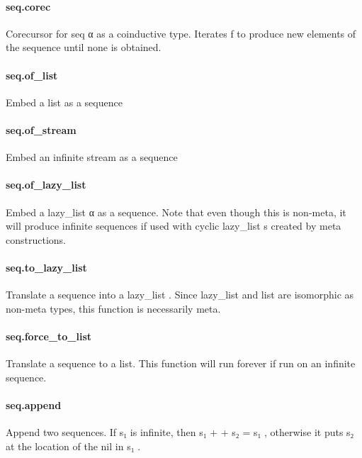 \documentclass{article}
\begin{document}
\paragraph{seq.corec}
\par
Corecursor for 
\colorbox[RGB]{253,246,227}{{{{\color[RGB]{101, 123, 131} seq α }}}} as a coinductive type. Iterates 
\colorbox[RGB]{253,246,227}{{{{\color[RGB]{101, 123, 131} f }}}} to produce new elements
of the sequence until 
\colorbox[RGB]{253,246,227}{{{{\color[RGB]{101, 123, 131} none }}}} is obtained.
\paragraph{seq.of\_list}
\par
Embed a list as a sequence
\paragraph{seq.of\_stream}
\par
Embed an infinite stream as a sequence
\paragraph{seq.of\_lazy\_list}
\par
Embed a 
\colorbox[RGB]{253,246,227}{{{{\color[RGB]{101, 123, 131} lazy\_list α }}}} as a sequence. Note that even though this
is non-meta, it will produce infinite sequences if used with
cyclic 
\colorbox[RGB]{253,246,227}{{{{\color[RGB]{101, 123, 131} lazy\_list }}}}s created by meta constructions.
\paragraph{seq.to\_lazy\_list}
\par
Translate a sequence into a 
\colorbox[RGB]{253,246,227}{{{{\color[RGB]{101, 123, 131} lazy\_list }}}}. Since 
\colorbox[RGB]{253,246,227}{{{{\color[RGB]{101, 123, 131} lazy\_list }}}} and 
\colorbox[RGB]{253,246,227}{{{{\color[RGB]{101, 123, 131} list }}}}are isomorphic as non-meta types, this function is necessarily meta.
\paragraph{seq.force\_to\_list}
\par
Translate a sequence to a list. This function will run forever if
run on an infinite sequence.
\paragraph{seq.append}
\par
Append two sequences. If 
\colorbox[RGB]{253,246,227}{{{{\color[RGB]{101, 123, 131} s₁ }}}} is infinite, then 
\colorbox[RGB]{253,246,227}{{{{\color[RGB]{101, 123, 131} s₁  }}}{{{\color[RGB]{181, 137, 0} + }}}{{{\color[RGB]{181, 137, 0} + }}}{{{\color[RGB]{101, 123, 131}  s₂  }}}{{{\color[RGB]{181, 137, 0} = }}}{{{\color[RGB]{101, 123, 131}  s₁ }}}},
otherwise it puts 
\colorbox[RGB]{253,246,227}{{{{\color[RGB]{101, 123, 131} s₂ }}}} at the location of the 
\colorbox[RGB]{253,246,227}{{{{\color[RGB]{101, 123, 131} nil }}}} in 
\colorbox[RGB]{253,246,227}{{{{\color[RGB]{101, 123, 131} s₁ }}}}.
\end{document}
